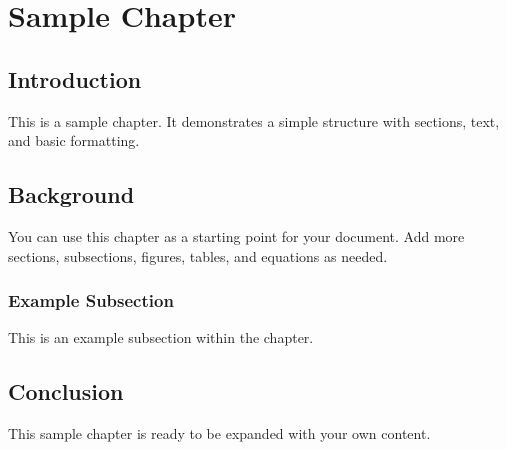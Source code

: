 \chapter{Sample Chapter}

\section{Introduction}
This is a sample chapter. It demonstrates a simple structure with sections, text, and basic formatting.

\section{Background}
You can use this chapter as a starting point for your document. Add more sections, subsections, figures, tables, and equations as needed.

\subsection{Example Subsection}
This is an example subsection within the chapter.

\section{Conclusion}
This sample chapter is ready to be expanded with your own content.